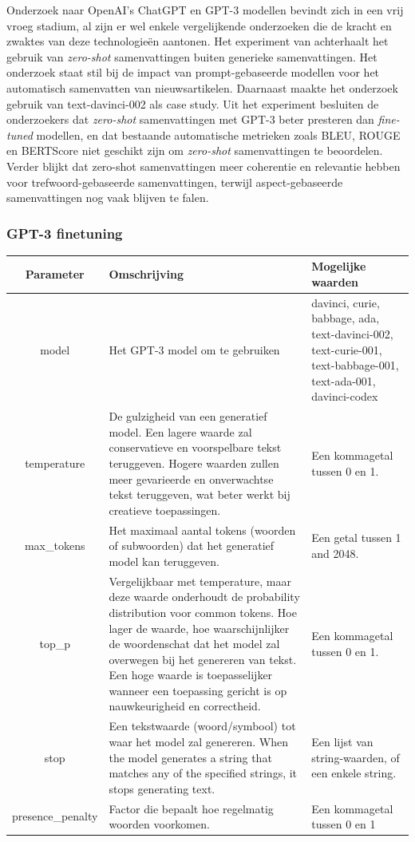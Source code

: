 Onderzoek naar OpenAI's ChatGPT en GPT-3 modellen bevindt zich in een vrij vroeg stadium, al zijn er wel enkele vergelijkende onderzoeken die de kracht en zwaktes van deze technologieën aantonen. Het experiment van \textcite{Goyal2022} achterhaalt het gebruik van \textit{zero-shot} samenvattingen buiten generieke samenvattingen. Het onderzoek staat stil bij de impact van prompt-gebaseerde modellen voor het automatisch samenvatten van nieuwsartikelen. Daarnaast maakte het onderzoek gebruik van text-davinci-002 als case study. Uit het experiment besluiten de onderzoekers dat \textit{zero-shot} samenvattingen met GPT-3 beter presteren dan \textit{fine-tuned} modellen, en dat bestaande automatische metrieken zoals BLEU, ROUGE en BERTScore niet geschikt zijn om \textit{zero-shot} samenvattingen te beoordelen. Verder blijkt dat zero-shot samenvattingen meer coherentie en relevantie hebben voor trefwoord-gebaseerde samenvattingen, terwijl aspect-gebaseerde samenvattingen nog vaak blijven te falen.

\subsubsection{GPT-3 finetuning}

\begin{tabular}{|c|p{7cm}|p{5cm}|}
	\hline
	Parameter & Omschrijving & Mogelijke waarden \\
	\hline
	model & Het GPT-3 model om te gebruiken & davinci, curie, babbage, ada, text-davinci-002, text-curie-001, text-babbage-001, text-ada-001, davinci-codex \\
	\hline
	temperature & De gulzigheid van een generatief model. Een lagere waarde zal conservatieve en voorspelbare tekst teruggeven. Hogere waarden zullen meer gevarieerde en onverwachtse tekst teruggeven, wat beter werkt bij creatieve toepassingen. & Een kommagetal tussen 0 en 1. \\
	\hline
	max\_tokens & Het maximaal aantal tokens (woorden of subwoorden) dat het generatief model kan teruggeven. & Een getal tussen 1 and 2048. \\
	\hline
	top\_p & Vergelijkbaar met temperature, maar deze waarde onderhoudt de probability distribution voor common tokens. Hoe lager de waarde, hoe waarschijnlijker de woordenschat dat het model zal overwegen bij het genereren van tekst. Een hoge waarde is toepasselijker wanneer een toepassing gericht is op nauwkeurigheid en correctheid. & Een kommagetal tussen 0 en 1. \\
	\hline
	stop & Een tekstwaarde (woord/symbool) tot waar het model zal genereren. When the model generates a string that matches any of the specified strings, it stops generating text. & Een lijst van string-waarden, of een enkele string. \\
	\hline
	presence\_penalty & Factor die bepaalt hoe regelmatig woorden voorkomen. & Een kommagetal tussen 0 en 1 \\
	\hline
\end{tabular}

